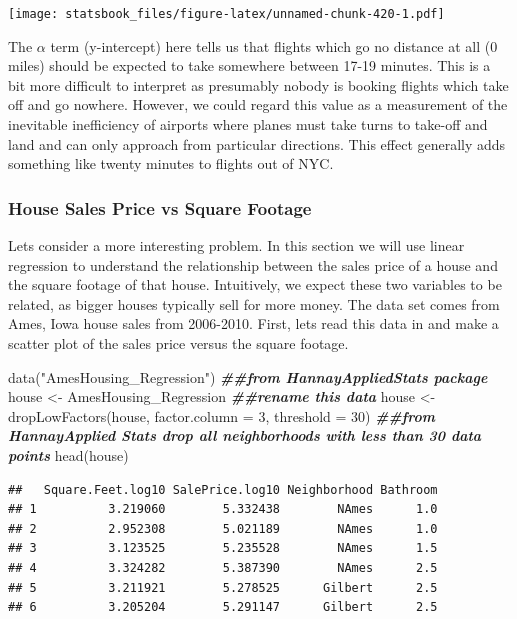 \documentclass[
]{book}
\newenvironment{Shaded}{\begin{snugshade}}{\end{snugshade}}
\newcommand{\AttributeTok}[1]{\textcolor[rgb]{0.77,0.63,0.00}{#1}}
\newcommand{\DecValTok}[1]{\textcolor[rgb]{0.00,0.00,0.81}{#1}}
\newcommand{\DocumentationTok}[1]{\textcolor[rgb]{0.56,0.35,0.01}{\textbf{\textit{#1}}}}
\newcommand{\FunctionTok}[1]{\textcolor[rgb]{0.00,0.00,0.00}{#1}}
\newcommand{\NormalTok}[1]{#1}
\newcommand{\OtherTok}[1]{\textcolor[rgb]{0.56,0.35,0.01}{#1}}
\newcommand{\StringTok}[1]{\textcolor[rgb]{0.31,0.60,0.02}{#1}}
\theoremstyle{definition}
\theoremstyle{definition}
\theoremstyle{definition}
\theoremstyle{definition}
\theoremstyle{remark}
\begin{document}
\texttt{[image: statsbook\_files/figure-latex/unnamed-chunk-420-1.pdf]}

The \(\alpha\) term (y-intercept) here tells us that flights which go no distance at all (0 miles) should be expected to take somewhere between 17-19 minutes. This is a bit more difficult to interpret as presumably nobody is booking flights which take off and go nowhere. However, we could regard this value as a measurement of the inevitable inefficiency of airports where planes must take turns to take-off and land and can only approach from particular directions. This effect generally adds something like twenty minutes to flights out of NYC.

\hypertarget{house-sales-price-vs-square-footage}{%
\subsubsection{House Sales Price vs Square Footage}\label{house-sales-price-vs-square-footage}}

Lets consider a more interesting problem. In this section we will use linear regression to understand the relationship between the sales price of a house and the square footage of that house. Intuitively, we expect these two variables to be related, as bigger houses typically sell for more money. The data set comes from Ames, Iowa house sales from 2006-2010. First, lets read this data in and make a scatter plot of the sales price versus the square footage.

\begin{Shaded}
\begin{Highlighting}[]
\FunctionTok{data}\NormalTok{(}\StringTok{"AmesHousing\_Regression"}\NormalTok{)  }\DocumentationTok{\#\#from HannayAppliedStats package}
\NormalTok{house }\OtherTok{\textless{}{-}}\NormalTok{ AmesHousing\_Regression  }\DocumentationTok{\#\#rename this data}
\NormalTok{house }\OtherTok{\textless{}{-}} \FunctionTok{dropLowFactors}\NormalTok{(house, }\AttributeTok{factor.column =} \DecValTok{3}\NormalTok{, }\AttributeTok{threshold =} \DecValTok{30}\NormalTok{)  }\DocumentationTok{\#\#from HannayApplied Stats drop all neighborhoods with less than 30 data points}
\FunctionTok{head}\NormalTok{(house)}
\end{Highlighting}
\end{Shaded}

\begin{verbatim}
##   Square.Feet.log10 SalePrice.log10 Neighborhood Bathroom
## 1          3.219060        5.332438        NAmes      1.0
## 2          2.952308        5.021189        NAmes      1.0
## 3          3.123525        5.235528        NAmes      1.5
## 4          3.324282        5.387390        NAmes      2.5
## 5          3.211921        5.278525      Gilbert      2.5
## 6          3.205204        5.291147      Gilbert      2.5
\end{verbatim}
\end{document}

